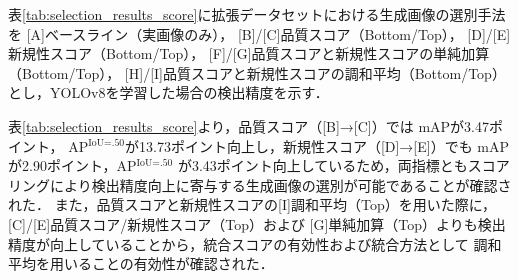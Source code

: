 \documentclass[Japanese]{dicomopapers}
\begin{document}
  表\ref{tab:selection_results_score}に拡張データセットにおける生成画像の選別手法を
  [A]ベースライン（実画像のみ），
  [B]/[C]品質スコア（Bottom/Top），
  [D]/[E]新規性スコア（Bottom/Top），
  [F]/[G]品質スコアと新規性スコアの単純加算（Bottom/Top），
  [H]/[I]品質スコアと新規性スコアの調和平均（Bottom/Top）
  とし，YOLOv8を学習した場合の検出精度を示す．

  \begin{table}[t]
    \centering
    \caption{各スコア計算によるYOLOv8の検出精度}
    \label{tab:selection_results_score}
  \end{table}
  \setlength{\textfloatsep}{8pt}
  
  表\ref{tab:selection_results_score}より，品質スコア（[B]→[C]）では mAPが3.47ポイント，
  AP${}^\text{IoU=.50}$が13.73ポイント向上し，新規性スコア（[D]→[E]）でも mAP が2.90ポイント，AP${}^\text{IoU=.50}$
  が3.43ポイント向上しているため，両指標ともスコアリングにより検出精度向上に寄与する生成画像の選別が可能であることが確認された．
  また，品質スコアと新規性スコアの[I]調和平均（Top）を用いた際に，[C]/[E]品質スコア/新規性スコア（Top）および
  [G]単純加算（Top）よりも検出精度が向上していることから，統合スコアの有効性および統合方法として
  調和平均を用いることの有効性が確認された．
\end{document}
